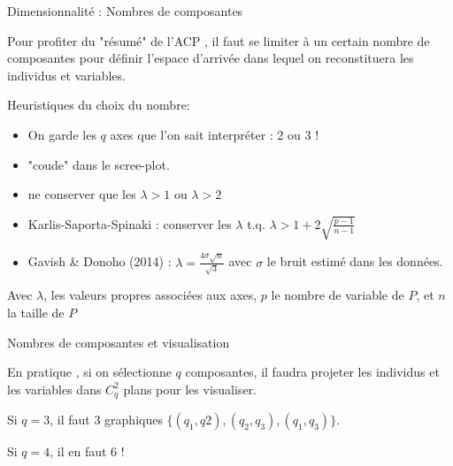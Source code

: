 \documentclass{beamer}
\begin{document}
\begin{frame}{Dimensionnalité : Nombres de composantes}


Pour profiter du "résumé" de l'ACP , il faut se limiter à un certain nombre de composantes pour définir l'espace d'arrivée dans lequel on reconstituera les individus et variables. 

\medskip

Heuristiques du choix du nombre: 

\begin{itemize}
  \item On garde les $q$ axes que l'on sait \alert{interpréter} : 2 ou 3 !
  \item "coude" dans le scree-plot.
  \item ne conserver que les $\lambda > 1$ ou $\lambda > 2$
  \item Karlis-Saporta-Spinaki :  conserver les $\lambda$ t.q. $\lambda > 1 + 2 \sqrt{\frac{p-1}{n-1}}$
  \item Gavish \& Donoho (2014) : $\lambda = \frac{4 \sigma \sqrt{n}}{\sqrt{3}}$ avec $\sigma$ le bruit estimé dans les données.
  \end{itemize}

\begin{tiny}
Avec $\lambda$, les valeurs propres associées aux axes, $p$ le nombre de variable de $P$, et $n$ la taille de $P$
\end{tiny}


\end{frame}







\begin{frame}{Nombres de composantes et visualisation}


En pratique , si on sélectionne $q$ composantes, il faudra projeter les individus et les variables dans $C_q^2$ plans pour les visualiser.

\medskip

Si $q=3$, il faut 3 graphiques  $\{(q_1,q2) , (q_2,q_3), (q_1,q_3)\} $.

Si $q=4$, il en faut 6 !

\end{frame}
\end{document}
